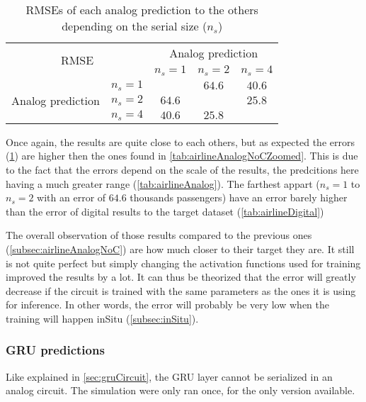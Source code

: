 \begin{table}[H]
  \centering
  \begin{tabular}{|c|c|c|c|c|}
    \hline
    \multicolumn{2}{|c}{\multirow{2}{*}{\ac{RMSE}}} & \multicolumn{3}{|c|}{Analog prediction}\\
    \cline{3-5}
    \multicolumn{2}{|c}{} & \multicolumn{1}{|c|}{$n_s=1$} & $n_s=2$ & $n_s=4$ \\
    \hline
    \multirow{3}{*}{Analog prediction} & $n_s=1$ &\cellcolor[HTML]{202020} & $64.6$ & $40.6$\\
    \cline{2-5}
    & $n_s=2$  & $64.6$ & \cellcolor[HTML]{202020} & $25.8$\\
    \cline{2-5}
    & $n_s=4$ & $40.6$ & $25.8$ & \cellcolor[HTML]{202020}\\
    \hline
  \end{tabular}
  \caption{\acp{RMSE} of each analog prediction to the others depending on the serial size ($n_s$)}
  \label{tab:airlineAnalogError}
\end{table}

Once again, the results are quite close to each others, but as expected the errors (\cref{tab:airlineAnalogError}) are higher then the ones found in \cref{tab:airlineAnalogNoCZoomed}. This is due to the fact that the errors depend on the scale of the results, the predcitions here having a much greater range (\cref{tab:airlineAnalog}). The farthest appart ($n_s=1$ to $n_s=2$ with an error of $64.6$ thousands passengers) have an error barely higher than the error of digital results to the target dataset (\cref{tab:airlineDigital})

The overall observation of those results compared to the previous ones (\cref{subsec:airlineAnalogNoC}) are how much closer to their target they are. It still is not quite perfect but simply changing the activation functions used for training improved the results by a lot. It can thus be theorized that the error will greatly decrease if the circuit is trained with the same parameters as the ones it is using for inference. In other words, the error will probably be very low when the training will happen inSitu (\cref{subsec:inSitu}).

\subsubsection{\ac{GRU} predictions}

Like explained in \cref{sec:gruCircuit}, the \ac{GRU} layer cannot be serialized in an analog circuit. The simulation were only ran once, for the only version available.

